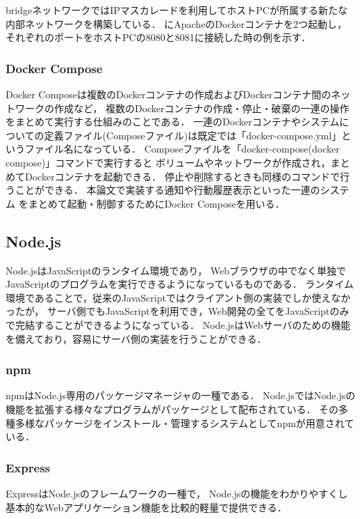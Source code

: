 \documentclass[12pt]{honka_v1}
\begin{document}
bridgeネットワークではIPマスカレードを利用してホストPCが所属する新たな内部ネットワークを構築している．
にApacheのDockerコンテナを2つ起動し，
それぞれのポートをホストPCの8080と8081に接続した時の例を示す．


\subsubsection{Docker Compose}
Docker Composeは複数のDockerコンテナの作成およびDockerコンテナ間のネットワークの作成など，
複数のDockerコンテナの作成・停止・破棄の一連の操作をまとめて実行する仕組みのことである\cite{bib:docker-book}．
一連のDockerコンテナやシステムについての定義ファイル(Composeファイル)は既定では「docker-compose.yml」というファイル名になっている．
Composeファイルを「docker-compose(docker compose)」コマンドで実行すると
ボリュームやネットワークが作成され，まとめてDockerコンテナを起動できる．
停止や削除するときも同様のコマンドで行うことができる．
本論文で実装する通知や行動履歴表示といった一連のシステム
をまとめて起動・制御するためにDocker Composeを用いる．

\subsection{Node.js}
Node.jsはJavaScriptのランタイム環境であり，
Webブラウザの中でなく単独でJavaScriptのプログラムを実行できるようになっているものである\cite{bib:node-book}．
ランタイム環境であることで，従来のJavaScriptではクライアント側の実装でしか使えなかったが，
サーバ側でもJavaScriptを利用でき，Web開発の全てをJavaScriptのみで完結することができるようになっている．
Node.jsはWebサーバのための機能を備えており，容易にサーバ側の実装を行うことができる．

\subsubsection{npm}
npmはNode.js専用のパッケージマネージャの一種である\cite{bib:node-book}．
Node.jsではNode.jsの機能を拡張する様々なプログラムがパッケージとして配布されている．
その多種多様なパッケージをインストール・管理するシステムとしてnpmが用意されている．

\subsubsection{Express}
ExpressはNode.jsのフレームワークの一種で，
Node.jsの機能をわかりやすくし基本的なWebアプリケーション機能を比較的軽量で提供できる\cite{bib:node-book}．
\end{document}
